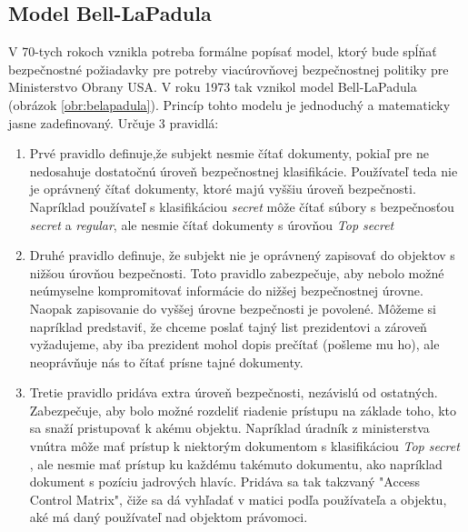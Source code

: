\subsection{Model Bell-LaPadula} 
V 70-tych rokoch vznikla potreba formálne popísať model, ktorý bude spĺňať bezpečnostné požiadavky pre potreby viacúrovňovej bezpečnostnej politiky pre Ministerstvo Obrany USA.
V roku 1973 tak vznikol model Bell-LaPadula \cite{bell-lapadula} (obrázok \ref{obr:belapadula}). Princíp tohto modelu je jednoduchý  a matematicky jasne zadefinovaný. Určuje 3 pravidlá: 
\begin{enumerate}
	\item Prvé pravidlo definuje,že subjekt nesmie čítať dokumenty, pokiaľ pre ne nedosahuje dostatočnú úroveň bezpečnostnej klasifikácie. Používateľ teda nie je oprávnený čítať dokumenty, ktoré majú vyššiu úroveň bezpečnosti. Napríklad používateľ s klasifikáciou  \emph{secret} môže čítať súbory s bezpečnosťou \emph{secret} a  \emph{regular}, ale nesmie čítať dokumenty s úrovňou  \emph{Top secret}
	\item Druhé pravidlo definuje, že subjekt nie je oprávnený zapisovať do objektov s nižšou úrovňou bezpečnosti. Toto pravidlo zabezpečuje, aby nebolo možné neúmyselne kompromitovať informácie do nižšej bezpečnostnej úrovne. Naopak zapisovanie do vyššej úrovne bezpečnosti je povolené. Môžeme si napríklad predstaviť, že chceme poslať tajný list prezidentovi a zároveň vyžadujeme, aby iba prezident mohol dopis prečítať (pošleme mu ho), ale neoprávňuje nás to čítať prísne tajné dokumenty.
	\item Tretie pravidlo pridáva extra úroveň bezpečnosti, nezávislú od ostatných. Zabezpečuje, aby bolo možné rozdeliť riadenie prístupu na základe toho, kto sa snaží pristupovať k akému objektu. Napríklad úradník z ministerstva vnútra môže mať prístup k niektorým dokumentom s klasifikáciou \emph{Top secret} , ale nesmie mať prístup ku každému takémuto dokumentu, ako napríklad dokument s pozíciu jadrových hlavíc. Pridáva sa tak  takzvaný "Access Control Matrix", čiže sa dá vyhľadať v matici podľa používateľa a objektu, aké má daný používateľ nad objektom právomoci.
\end{enumerate}

